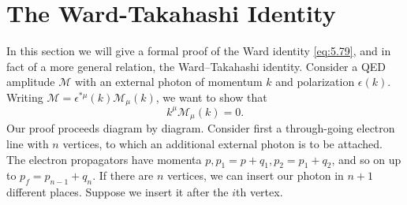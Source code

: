 \section{The Ward-Takahashi Identity}

In this section we will give a formal proof of the Ward identity
\eqref{eq:5.79}, and in fact of a more general relation, the
Ward--Takahashi identity.  Consider a QED amplitude $\mathcal{M}$ with an
external photon of momentum $k$ and polarization $\epsilon(k)$.  Writing
$\mathcal{M} = \epsilon^{*\mu}(k)\mathcal{M}_\mu(k)$, we want to show that
\begin{equation}
  k^\mu\mathcal{M}_\mu(k) = 0 .
  \label{eq:7.64}
\end{equation}
Our proof proceeds diagram by diagram.  Consider first a through-going
electron line with $n$ vertices, to which an additional external photon is to
be attached.  The electron propagators have momenta $p, p_1 = p+q_1,
p_2 = p_1+q_2$, and so on up to $p_f = p_{n-1}+q_n$.  If there are $n$
vertices, we can insert our photon in $n+1$ different places.  Suppose we
insert it after the $i$th vertex.

